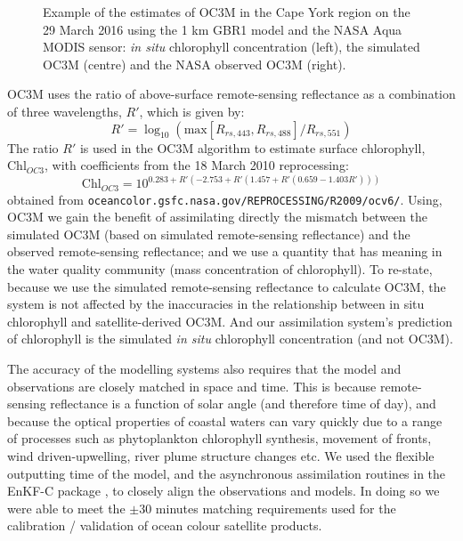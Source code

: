 \documentclass{elsart}
\begin{document}
\begin{figure}[thb]
\begin{center}
\caption{Example of the estimates of OC3M in the Cape York region on the 29 March 2016 using the 1 km GBR1 model and the NASA Aqua MODIS sensor: \textit{in situ} chlorophyll concentration (left), the simulated OC3M (centre) and the NASA observed OC3M (right).}
\label{fig:OC3M}
\end{center}
\end{figure}

OC3M uses the ratio of above-surface remote-sensing reflectance as a combination of three wavelengths, $R'$, which is given by:
\begin{equation}
R' = \log_{10} \left( \mathrm{max} \left[ R_{rs,443}, R_{rs,488} \right] / R_{rs,551} \right)
\end{equation}
The ratio $R'$ is used in the OC3M algorithm to estimate surface chlorophyll, $\mathrm{Chl}_{OC3}$, with coefficients from the 18 March 2010 reprocessing:
\begin{equation}
\mathrm{Chl}_{OC3} = 10^{0.283 + R' \left(-2.753 + R' \left( 1.457 + R' \left(0.659 - 1.403 R' \right) \right) \right)}
\end{equation}
obtained from \texttt{oceancolor.gsfc.nasa.gov/REPROCESSING/R2009/ocv6/}. Using, OC3M we gain the benefit of assimilating directly the mismatch between the simulated OC3M (based on simulated remote-sensing reflectance) and the observed remote-sensing reflectance; and we use a quantity that has meaning in the water quality community (mass concentration of chlorophyll). To re-state, because we use the simulated remote-sensing reflectance to calculate OC3M, the system is not affected by the  inaccuracies in the relationship between in situ chlorophyll and satellite-derived OC3M. And our assimilation system's prediction of chlorophyll is the simulated \textit{in situ} chlorophyll concentration (and not OC3M).

The accuracy of the modelling systems also requires that the model and observations are closely matched in space and time. This is because remote-sensing reflectance is a function of solar angle (and therefore time of day), and because the optical properties of coastal waters can vary quickly due to a range of processes such as phytoplankton chlorophyll synthesis, movement of fronts, wind driven-upwelling, river plume structure changes etc. We used the flexible outputting time of the model, and the asynchronous assimilation routines in the EnKF-C package \citep{Sakov17}, to closely align the observations and models. In doing so we were able to meet the $\pm 30$ minutes matching requirements used for the calibration / validation of ocean colour satellite products.
\end{document}
